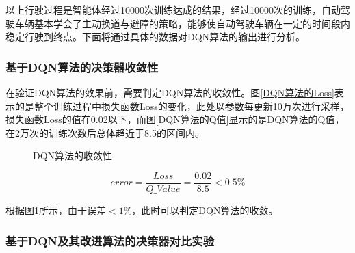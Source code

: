 以上行驶过程是智能体经过10000次训练达成的结果，经过10000次的训练，自动驾驶车辆基本学会了主动换道与避障的策略，能够使自动驾驶车辆在一定的时间段内稳定行驶到终点。下面将通过具体的数据对DQN算法的输出进行分析。

\subsubsection{基于DQN算法的决策器收敛性}

在验证DQN算法的效果前，需要判定DQN算法的收敛性。图\ref{DQN算法的Loss}表示的是整个训练过程中损失函数Loss的变化，此处以参数每更新10万次进行采样，损失函数Loss的值在0.02以下，而图\ref{DQN算法的Q值}显示的是DQN算法的Q值，在2万次的训练次数后总体趋近于8.5的区间内。

\begin{figure}[htbp]
    \vspace{13pt}
    \centering
    \caption{DQN算法的收敛性}\label{DQN算法的收敛性} 
\end{figure}

\begin{equation}
    error = \frac{Loss}{Q\_Value} = \frac{0.02}{8.5} < 0.5\%
\end{equation}\label{dqn-decision-error}

根据图\ref{DQN算法的收敛性}所示，由于误差$<1\%$，此时可以判定DQN算法的收敛。

\subsubsection{基于DQN及其改进算法的决策器对比实验}


